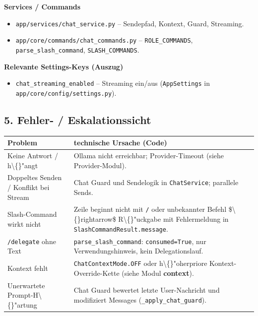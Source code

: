 \textbf{Services / Commands}

\begin{itemize}
\item \texttt{app/services/chat\_service.py} -- Sendepfad, Kontext, Guard, Streaming.
\item \texttt{app/core/commands/chat\_commands.py} -- \texttt{ROLE\_COMMANDS}, \texttt{parse\_slash\_command}, \texttt{SLASH\_COMMANDS}.
\end{itemize}

\textbf{Relevante Settings-Keys (Auszug)}

\begin{itemize}
\item \texttt{chat\_streaming\_enabled} -- Streaming ein/aus (\texttt{AppSettings} in \texttt{app/core/config/settings.py}).
\end{itemize}

\subsection{5. Fehler- / Eskalationssicht}

\begin{center}
\begin{tabular}{ll}
\hline
Problem & technische Ursache (Code) \\
\hline
Keine Antwort / h\textbackslash\{\}"angt & Ollama nicht erreichbar; Provider-Timeout (siehe Provider-Modul). \\
Doppeltes Senden / Konflikt bei Stream & Chat Guard und Sendelogik in \texttt{ChatService}; parallele Sends. \\
Slash-Command wirkt nicht & Zeile beginnt nicht mit \texttt{/} oder unbekannter Befehl \$\textbackslash\{\}rightarrow\$ R\textbackslash\{\}"uckgabe mit Fehlermeldung in \texttt{SlashCommandResult.message}. \\
\texttt{/delegate} ohne Text & \texttt{parse\_slash\_command}: \texttt{consumed=True}, nur Verwendungshinweis, kein Delegationslauf. \\
Kontext fehlt & \texttt{ChatContextMode.OFF} oder h\textbackslash\{\}"oherpriore Kontext-Override-Kette (siehe Modul \textbf{context}). \\
Unerwartete Prompt-H\textbackslash\{\}"artung & Chat Guard bewertet letzte User-Nachricht und modifiziert Messages (\texttt{\_apply\_chat\_guard}). \\
\hline
\end{tabular}
\end{center}

